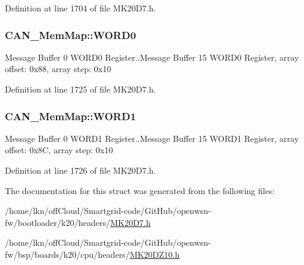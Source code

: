 Definition at line 1704 of file M\+K20\+D7.\+h.

\subsubsection[{\texorpdfstring{W\+O\+R\+D0}{WORD0}}]{ C\+A\+N\+\_\+\+Mem\+Map\+::\+W\+O\+R\+D0}\hypertarget{struct_c_a_n___mem_map_ac2b68cfbc9aeab141d20ae8bd73cd169}{}\label{struct_c_a_n___mem_map_ac2b68cfbc9aeab141d20ae8bd73cd169}
Message Buffer 0 W\+O\+R\+D0 Register..Message Buffer 15 W\+O\+R\+D0 Register, array offset\+: 0x88, array step\+: 0x10 

Definition at line 1725 of file M\+K20\+D7.\+h.

\subsubsection[{\texorpdfstring{W\+O\+R\+D1}{WORD1}}]{ C\+A\+N\+\_\+\+Mem\+Map\+::\+W\+O\+R\+D1}\hypertarget{struct_c_a_n___mem_map_ae9343e0c532c0f3784d9960ffb8aa229}{}\label{struct_c_a_n___mem_map_ae9343e0c532c0f3784d9960ffb8aa229}
Message Buffer 0 W\+O\+R\+D1 Register..Message Buffer 15 W\+O\+R\+D1 Register, array offset\+: 0x8C, array step\+: 0x10 

Definition at line 1726 of file M\+K20\+D7.\+h.



The documentation for this struct was generated from the following files\+:\begin{DoxyCompactItemize}
\item 
/home/lkn/off\+Cloud/\+Smartgrid-\/code/\+Git\+Hub/openwsn-\/fw/bootloader/k20/headers/\hyperlink{bootloader_2k20_2headers_2_m_k20_d7_8h}{M\+K20\+D7.\+h}\item 
/home/lkn/off\+Cloud/\+Smartgrid-\/code/\+Git\+Hub/openwsn-\/fw/bsp/boards/k20/cpu/headers/\hyperlink{_m_k20_d_z10_8h}{M\+K20\+D\+Z10.\+h}\end{DoxyCompactItemize}
